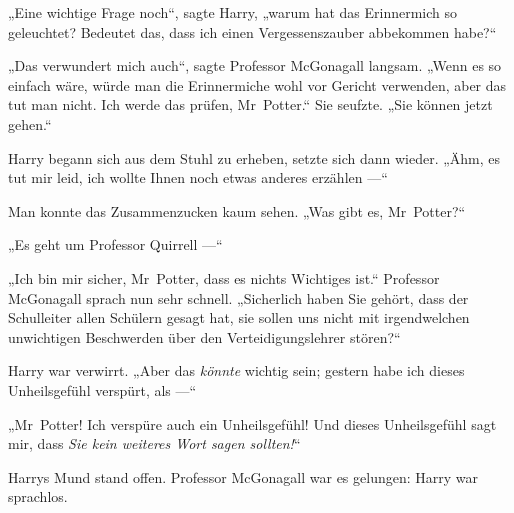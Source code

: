 „Eine wichtige Frage noch“, sagte Harry, „warum hat das Erinnermich so geleuchtet? Bedeutet das, dass ich einen Vergessenszauber abbekommen habe?“

„Das verwundert mich auch“, sagte Professor McGonagall langsam.
„Wenn es so einfach wäre, würde man die Erinnermiche wohl vor Gericht verwenden, aber das tut man nicht. Ich werde das prüfen, Mr~Potter.“ Sie seufzte.
„Sie können jetzt gehen.“

Harry begann sich aus dem Stuhl zu erheben, setzte sich dann wieder. „Ähm, es tut mir leid, ich wollte Ihnen noch etwas anderes erzählen —“

Man konnte das Zusammenzucken kaum sehen.
„Was gibt es, Mr~Potter?“

„Es geht um Professor Quirrell —“

„Ich bin mir sicher, Mr~Potter, dass es nichts Wichtiges ist.“ Professor McGonagall sprach nun sehr schnell.
„Sicherlich haben Sie gehört, dass der Schulleiter allen Schülern gesagt hat, sie sollen uns nicht mit irgendwelchen unwichtigen Beschwerden über den Verteidigungslehrer stören?“

Harry war verwirrt.
„Aber das \emph{könnte} wichtig sein; gestern habe ich dieses Unheilsgefühl verspürt, als —“

„Mr~Potter! Ich verspüre auch ein Unheilsgefühl! Und dieses Unheilsgefühl sagt mir, dass \emph{Sie kein weiteres Wort sagen sollten!}“

Harrys Mund stand offen. Professor McGonagall war es gelungen: Harry war sprachlos.


